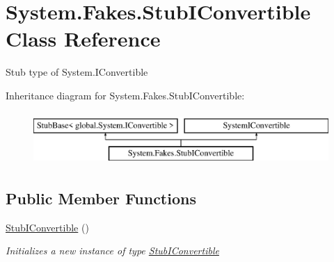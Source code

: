 \hypertarget{class_system_1_1_fakes_1_1_stub_i_convertible}{\section{System.\-Fakes.\-Stub\-I\-Convertible Class Reference}
\label{class_system_1_1_fakes_1_1_stub_i_convertible}
}


Stub type of System.\-I\-Convertible 


Inheritance diagram for System.\-Fakes.\-Stub\-I\-Convertible\-:\begin{figure}[H]
\begin{center}
\leavevmode
\includegraphics[height=2.000000cm]{class_system_1_1_fakes_1_1_stub_i_convertible}
\end{center}
\end{figure}
\subsection*{Public Member Functions}
\begin{DoxyCompactItemize}
\item 
\hyperlink{class_system_1_1_fakes_1_1_stub_i_convertible_a03b98ca9798eba78a218c8b4c71511a9}{Stub\-I\-Convertible} ()
\begin{DoxyCompactList}\small\item\em Initializes a new instance of type \hyperlink{class_system_1_1_fakes_1_1_stub_i_convertible}{Stub\-I\-Convertible}\end{DoxyCompactList}\end{DoxyCompactItemize}
